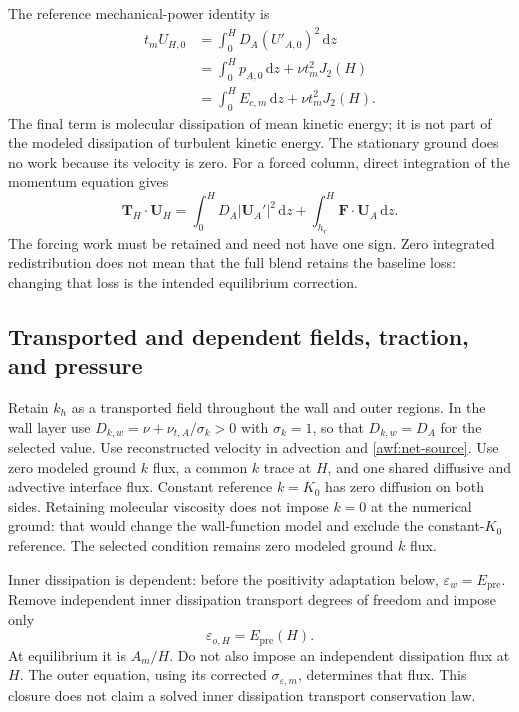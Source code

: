 \documentclass[11pt,a4paper]{article}
\numberwithin{equation}{section}
\newcommand{\eps}{\varepsilon}
\newcommand{\dd}{\mathrm d}
\begin{document}
The reference mechanical-power identity is
\begin{equation}
 \begin{aligned}
 t_mU_{H,0}
 &=\int_0^HD_A(U'_{A,0})^2\,\dd z\\
 &=\int_0^Hp_{A,0}\,\dd z+\nu t_m^2J_2(H)\\
 &=\boxed{\int_0^HE_{c,m}\,\dd z+\nu t_m^2J_2(H)} .
 \end{aligned}
 \label{awf:energy}
\end{equation}
The final term is molecular dissipation of mean kinetic energy; it
is not part of the modeled dissipation of turbulent kinetic energy.
The stationary ground does no work because its velocity is zero.
For a forced column, direct integration of the momentum equation gives
\begin{equation}
 \boldsymbol T_H\cdot\boldsymbol U_H
 =\int_0^HD_A|\boldsymbol U_A'|^2\,\dd z
  +\int_{h_r}^H\boldsymbol F\cdot\boldsymbol U_A\,\dd z.
 \label{awf:forced-energy}
\end{equation}
The forcing work must be retained and need not have one sign.
Zero integrated redistribution does not mean that the full blend
retains the baseline loss: changing that loss is the intended
equilibrium correction.

\subsection{Transported and dependent fields, traction, and pressure}
\label{awf:interface}

Retain $k_h$ as a transported field throughout the wall and outer
regions. In the wall layer use
$D_{k,w}=\nu+\nu_{t,A}/\sigma_k>0$ with $\sigma_k=1$, so that
$D_{k,w}=D_A$ for the selected value. Use reconstructed velocity in advection and
\cref{awf:net-source}. Use zero modeled ground $k$ flux, a common
$k$ trace at $H$, and one shared diffusive and advective interface flux.
Constant reference $k=K_0$ has zero diffusion on both sides.
Retaining molecular viscosity does not impose $k=0$ at the numerical
ground: that would change the wall-function model and exclude the
constant-$K_0$ reference. The selected condition remains zero modeled
ground $k$ flux.

Inner dissipation is dependent: before the positivity adaptation below,
$\eps_w=E_{\mathrm{pre}}$. Remove independent inner dissipation
transport degrees of freedom and impose only
\begin{equation}
 \boxed{\eps_{o,H}=E_{\mathrm{pre}}(H).}
 \label{awf:epsilon-trace}
\end{equation}
At equilibrium it is $A_m/H$. Do not also impose an independent
dissipation flux at $H$. The outer equation, using its corrected
$\sigma_{\eps,m}$, determines that flux. This closure does not claim
a solved inner dissipation transport conservation law.
\end{document}
